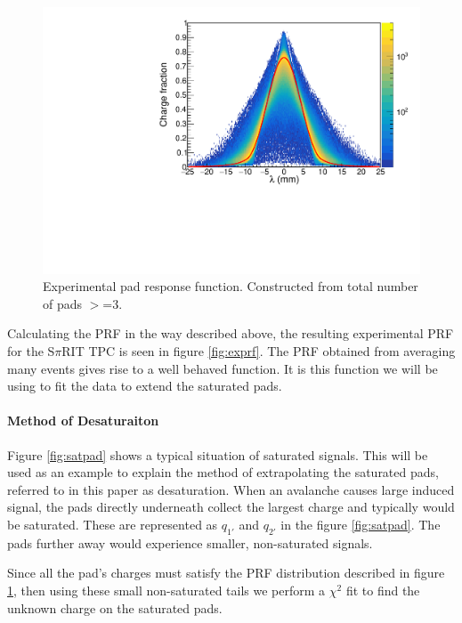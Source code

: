 \documentclass[review]{elsarticle}
\begin{document}
\begin{figure}[ht]
\includegraphics[width=\linewidth]{expprf}
\caption{Experimental pad response function. Constructed from total number of pads $>$=3. }
\label{fig:expprf}
\end{figure}

Calculating the PRF in the way described above, the resulting experimental PRF for the S$\pi$RIT TPC is seen in figure \ref{fig:exprf}. The PRF obtained from averaging many events gives rise to a well behaved function. It is this function we will be using to fit the data to extend the saturated pads. 

\paragraph{Method of Desaturaiton}

Figure \ref{fig:satpad} shows a typical situation of saturated signals. This will be used as an example to explain the method of extrapolating the saturated pads, referred to in this paper as desaturation. When an avalanche causes large induced signal, the pads directly underneath collect the largest charge and typically would be saturated. These are represented as $q_{1'}$ and $q_{2'}$ in the figure \ref{fig:satpad}. The pads further away would experience smaller, non-saturated signals. 

Since all the pad's charges must satisfy the PRF distribution described in figure \ref{fig:expprf}, then using these small non-saturated tails we perform a $\chi^2$ fit to find the unknown charge on the saturated pads. 
\end{document}
